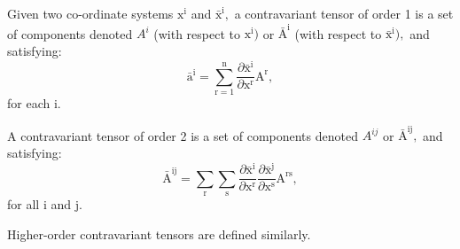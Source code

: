 Given two co-ordinate systems $ \mathrm{x}^{\mathrm{i}} $ and 
$ \bar{\mathrm{x}}^{\mathrm{i}} , $
a contravariant tensor of order 1 is a set of components denoted $A^{i}$  
(with respect to $ \mathrm{x}^{\mathrm{i}} ) $ or $ \bar{\mathrm{A}}^{\mathrm{i}} $
(with respect to $ \bar{\mathrm{x}}^{\mathrm{i}} )  , $
and satisfying:
\[ \bar{\mathrm{a}}^{\mathrm{i}} = \sum_{\mathrm{r}=1} ^{\mathrm{n}}
\frac{\partial \bar{\mathrm{x}}^{\mathrm{i}}}
{\partial \mathrm{x}^{\mathrm{r}}}
\mathrm{A}^{\mathrm{r}} , \] for each i.
\par
A contravariant tensor of order 2 is a set of components denoted $A^{ij}$ 
or $ \bar{\mathrm{A}}^{\mathrm{ij}} , $ and satisfying:
\[ \bar{\mathrm{A}}^{\mathrm{ij}} =
\sum _{\mathrm{r}} \sum _{\mathrm{s}}
\frac{\partial \bar{\mathrm{x}}^{\mathrm{i}}}
{\partial \mathrm{x}^{\mathrm{r}}}
\frac{\partial \bar{\mathrm{x}}^{\mathrm{j}}}
{\partial \mathrm{x}^{\mathrm{s}}}
\mathrm{A}^{\mathrm{rs}} , \]
for all i and j.
\par
Higher-order contravariant tensors are defined similarly.
